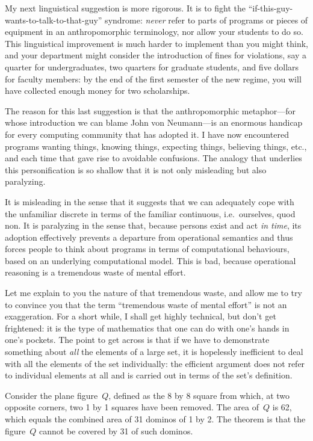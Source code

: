 \documentclass[a4paper,12pt]{article}
\begin{document}
My next linguistical suggestion is more rigorous.  It is to fight the
``if-this-guy-wants-to-talk-to-that-guy'' syndrome: \emph{never} refer to parts
of programs or pieces of equipment in an anthropomorphic terminology,
nor allow your students to do so.  This linguistical improvement is much
harder to implement than you might think, and your department might
consider the introduction of fines for violations, say a quarter for
undergraduates, two quarters for graduate students, and five dollars for
faculty members: by the end of the first semester of the new regime, you
will have collected enough money for two scholarships.

The reason for this last suggestion is that the anthropomorphic
metaphor---for whose introduction we can blame John von Neumann---is an
enormous handicap for every computing community that has adopted it.  I
have now encountered programs wanting things, knowing things, expecting
things, believing things, etc., and each time that gave rise to
avoidable confusions.  The analogy that underlies this personification
is so shallow that it is not only misleading but also paralyzing.

It is misleading in the sense that it suggests that we can adequately
cope with the unfamiliar discrete in terms of the familiar continuous,
i.e.\ ourselves, quod non.  It is paralyzing in the sense that, because
persons exist and act \emph{in time}, its adoption effectively prevents
a departure from operational semantics and thus forces people to think
about programs in terms of computational behaviours, based on an
underlying computational model.  This is bad, because operational
reasoning is a tremendous waste of mental effort.

Let me explain to you the nature of that tremendous waste, and allow me
to try to convince you that the term ``tremendous waste of mental
effort'' is not an exaggeration.  For a short while, I shall get highly
technical, but don't get frightened: it is the type of mathematics that
one can do with one's hands in one's pockets.  The point to get across
is that if we have to demonstrate something about \emph{all} the
elements of a large set, it is hopelessly inefficient to deal with all
the elements of the set individually: the efficient argument does not
refer to individual elements at all and is carried out in terms of the
set's definition.

Consider the plane figure~$Q$, defined as the 8 by 8 square from which,
at two opposite corners, two 1 by 1 squares have been removed.  The area
of~$Q$ is 62, which equals the combined area of 31 dominos of 1 by 2.
The theorem is that the figure~$Q$ cannot be covered by 31 of such
dominos.
\end{document}
